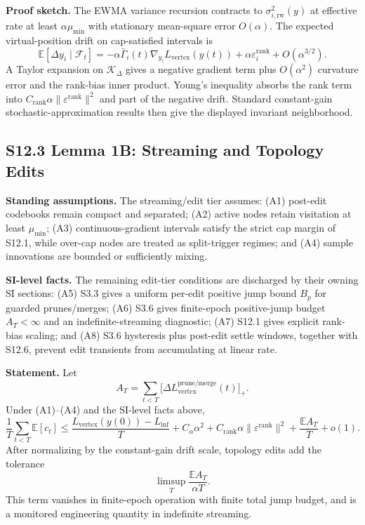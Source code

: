 \documentclass[11pt]{article}
\begin{document}
\textbf{Proof sketch.} The EWMA variance recursion contracts to $\sigma_{i,\mathrm{rw}}^2(y)$ at effective rate at least $\alpha\mu_{\min}$ with stationary mean-square error $O(\alpha)$. The expected virtual-position drift on cap-satisfied intervals is
\[
\mathbb E[\Delta y_i\mid\mathcal F_t]
=
-\alpha\bar\Gamma_i(t)\nabla_{y_i}L_{\mathrm{vertex}}(y(t))
+\alpha\varepsilon_i^{\mathrm{rank}}
+O(\alpha^{3/2}).
\]
A Taylor expansion on $\mathcal K_\Delta$ gives a negative gradient term plus $O(\alpha^2)$ curvature error and the rank-bias inner product. Young's inequality absorbs the rank term into $C_{\mathrm{rank}}\alpha\|\varepsilon^{\mathrm{rank}}\|^2$ and part of the negative drift. Standard constant-gain stochastic-approximation results then give the displayed invariant neighborhood.

\subsection*{S12.3 Lemma 1B: Streaming and Topology Edits}
\label{lem:si-streaming-edit-neighborhood}
\textbf{Standing assumptions.} The streaming/edit tier assumes: (A1) post-edit codebooks remain compact and separated; (A2) active nodes retain visitation at least $\mu_{\min}$; (A3) continuous-gradient intervals satisfy the strict cap margin of S12.1, while over-cap nodes are treated as split-trigger regimes; and (A4) sample innovations are bounded or sufficiently mixing.

\textbf{SI-level facts.} The remaining edit-tier conditions are discharged by their owning SI sections: (A5) S3.3 gives a uniform per-edit positive jump bound $B_p$ for guarded prunes/merges; (A6) S3.6 gives finite-epoch positive-jump budget $A_T<\infty$ and an indefinite-streaming diagnostic; (A7) S12.1 gives explicit rank-bias scaling; and (A8) S3.6 hysteresis plus post-edit settle windows, together with S12.6, prevent edit transients from accumulating at linear rate.

\textbf{Statement.} Let
\[
A_T
=
\sum_{t<T}
\bigl[\Delta L_{\mathrm{vertex}}^{\mathrm{prune/merge}}(t)\bigr]_+.
\]
Under (A1)--(A4) and the SI-level facts above,
\[
\frac1T\sum_{t<T}\mathbb E[c_t]
\le
\frac{L_{\mathrm{vertex}}(y(0))-L_{\inf}}{T}
+C_\alpha\alpha^2
+C_{\mathrm{rank}}\alpha\|\varepsilon^{\mathrm{rank}}\|^2
+\frac{\mathbb E A_T}{T}
+o(1).
\]
After normalizing by the constant-gain drift scale, topology edits add the tolerance
\[
\limsup_T\frac{\mathbb E A_T}{\alpha T}.
\]
This term vanishes in finite-epoch operation with finite total jump budget, and is a monitored engineering quantity in indefinite streaming.
\end{document}
